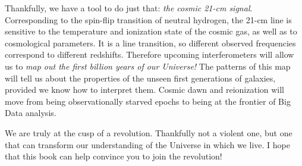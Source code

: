Thankfully, we have a tool to do just that: {\it the cosmic 21-cm signal}.  Corresponding to the spin-flip transition of neutral hydrogen, the 21-cm line is sensitive to the temperature and ionization state of the cosmic gas, as well as to cosmological parameters.  It is a line transition, so different observed frequencies correspond to different redshifts.  Therefore upcoming interferometers will allow us to {\it map out the first billion years of our Universe!}  The patterns of this map will tell us about the properties of the unseen first generations of galaxies, provided we know how to interpret them.  Cosmic dawn and reionization will move from being observationally starved epochs to being at the frontier of Big Data analysis.

We are truly at the cusp of a revolution.  Thankfully not a violent one, but one that can transform our understanding of the Universe in which we live.  I hope that this book can help convince you to join the revolution!
